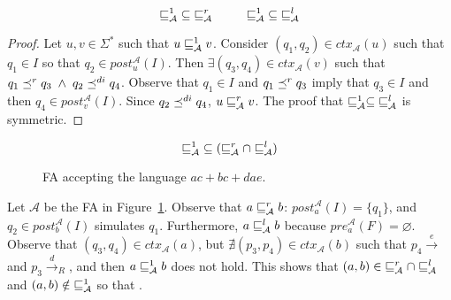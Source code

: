 \begin{proposition}
\label{proposition:wsdir-vs-wrdir}
\[ \sqsubseteq^1_{\mathcal{A}} \; \subseteq \; \sqsubseteq_{\mathcal{A}}^r \; \; \; \; \; \; \; \; \; \;
\sqsubseteq^1_{\mathcal{A}} \; \subseteq \; \sqsubseteq_{\mathcal{A}}^l \]
\end{proposition}

\begin{proof}
Let $u,v \in \Sigma^*$ such that $u \sqsubseteq^1_{\mathcal{A}} v$.
Consider $(q_1,q_2) \in ctx_{\mathcal{A}}(u)$ such that $q_1 \in I$ so that $q_2 \in post_u^{\mathcal{A}}(I)$.
Then $\exists (q_3,q_4) \in ctx_{\mathcal{A}}(v)$ such that $q_1 \preceq^r q_3 \;\wedge\; q_2 \preceq^{di} q_4$.
Observe that $q_1 \in I$ and $q_1 \preceq^r q_3$ imply that $q_3 \in I$ and then $q_4 \in post_v^{\mathcal{A}}(I)$.
Since $q_2 \preceq^{di} q_4$, $u \sqsubseteq_{\mathcal{A}}^r v$.
The proof that $\sqsubseteq^1_{\mathcal{A}} \subseteq \; \sqsubseteq_{\mathcal{A}}^l$ is symmetric.
\end{proof}

\begin{remark}
\[  \sqsubseteq^1_{\mathcal{A}} \; \subseteq (\sqsubseteq_{\mathcal{A}}^r \cap \sqsubseteq_{\mathcal{A}}^l) \]
\end{remark}

\begin{figure}[h]
\centering
{}
\caption{FA accepting the language $ac + bc + dae$.}
\label{fig:fa2}
\end{figure}

\begin{remark}
Let $\mathcal{A}$ be the FA in Figure~\ref{fig:fa2}.
Observe that $a \sqsubseteq_{\mathcal{A}}^r b$: $post_a^{\mathcal{A}}(I) = \{q_1\}$, and $q_2 \in post_b^{\mathcal{A}}(I)$ simulates $q_1$.
Furthermore, $a \sqsubseteq_{\mathcal{A}}^l b$ because $pre_a^{\mathcal{A}}(F) = \varnothing$.
Observe that $(q_3,q_4) \in ctx_{\mathcal{A}}(a)$, but $\nexists (p_3,p_4) \in ctx_{\mathcal{A}}(b)$ such that
$p_4 \overset{e}{\rightarrow} $ and $p_3 \overset{d}{\rightarrow}_R$,
and then $a \sqsubseteq^1_{\mathcal{A}} b$ does not hold.
This shows that $(a,b) \in \; \sqsubseteq_{\mathcal{A}}^r \cap \sqsubseteq_{\mathcal{A}}^l$ and
$(a,b) \notin \; \sqsubseteq^1_{\mathcal{A}}$ so that
.
\end{remark}


